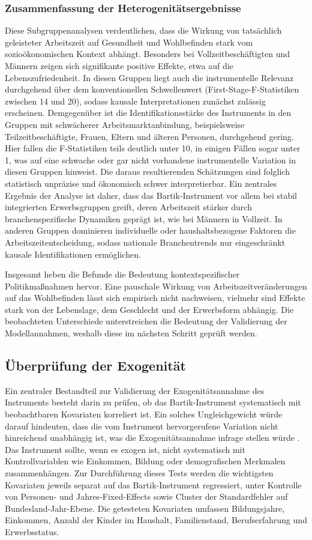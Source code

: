 \documentclass[12pt,a4paper]{article}
\begin{document}
\subsubsection{Zusammenfassung der Heterogenitätsergebnisse}
Diese Subgruppenanalysen verdeutlichen, dass die Wirkung von tatsächlich geleisteter Arbeitszeit auf Gesundheit und Wohlbefinden stark vom sozioökonomischen Kontext abhängt. Besonders bei Vollzeitbeschäftigten und Männern zeigen sich  signifikante positive Effekte, etwa auf die Lebenszufriedenheit. In diesen Gruppen liegt auch die instrumentelle Relevanz durchgehend über dem konventionellen Schwellenwert (First-Stage-F-Statistiken zwischen 14 und 20), sodass kausale Interpretationen zunächst zulässig erscheinen. Demgegenüber ist die Identifikationsstärke des Instruments in den Gruppen mit schwächerer Arbeitsmarktanbindung, beispielsweise Teilzeitbeschäftigte, Frauen, Eltern und älteren Personen, durchgehend gering. Hier fallen die F-Statistiken teils deutlich unter 10, in einigen Fällen sogar unter 1, was auf eine schwache oder gar nicht vorhandene instrumentelle Variation in diesen Gruppen hinweist. Die daraus resultierenden Schätzungen sind folglich statistisch unpräzise und ökonomisch schwer interpretierbar. Ein zentrales Ergebnis der Analyse ist daher, dass das Bartik-Instrument vor allem bei stabil integrierten Erwerbsgruppen greift, deren Arbeitszeit stärker durch branchenspezifische Dynamiken geprägt ist, wie bei Männern in Vollzeit. In anderen Gruppen dominieren  individuelle oder haushaltsbezogene Faktoren die Arbeitszeitentscheidung, sodass nationale Branchentrends nur eingeschränkt kausale Identifikationen ermöglichen. 

Insgesamt heben die Befunde die Bedeutung kontextspezifischer Politikmaßnahmen hervor. Eine pauschale Wirkung von Arbeitszeitveränderungen auf das Wohlbefinden lässt sich empirisch nicht nachweisen, vielmehr sind Effekte stark von der Lebenslage, dem Geschlecht und der Erwerbsform abhängig. Die beobachteten Unterschiede unterstreichen die Bedeutung der Validierung der Modellannahmen, weshalb diese im nächsten Schritt geprüft werden. 

\subsection{Überprüfung der Exogenität}
Ein zentraler Bestandteil zur Validierung der Exogenitätsannahme des Instruments besteht darin zu prüfen, ob das Bartik-Instrument systematisch mit beobachtbaren Kovariaten korreliert ist. Ein solches Ungleichgewicht würde darauf hindeuten, dass die vom Instrument hervorgerufene Variation nicht hinreichend unabhängig ist, was die Exogenitätsannahme infrage stellen würde \parencite{angrist2009}. Das Instrument sollte, wenn es exogen ist, nicht systematisch mit Kontrollvariablen wie Einkommen, Bildung oder demografischen Merkmalen zusammenhängen. Zur Durchführung dieses Tests werden die wichtigsten Kovariaten jeweils separat auf das Bartik-Instrument regressiert, unter Kontrolle von Personen- und Jahres-Fixed-Effects sowie Cluster der Standardfehler auf Bundesland-Jahr-Ebene. Die getesteten Kovariaten umfassen Bildungsjahre, Einkommen, Anzahl der Kinder im Haushalt, Familienstand, Berufserfahrung und Erwerbsstatus.
\end{document}
